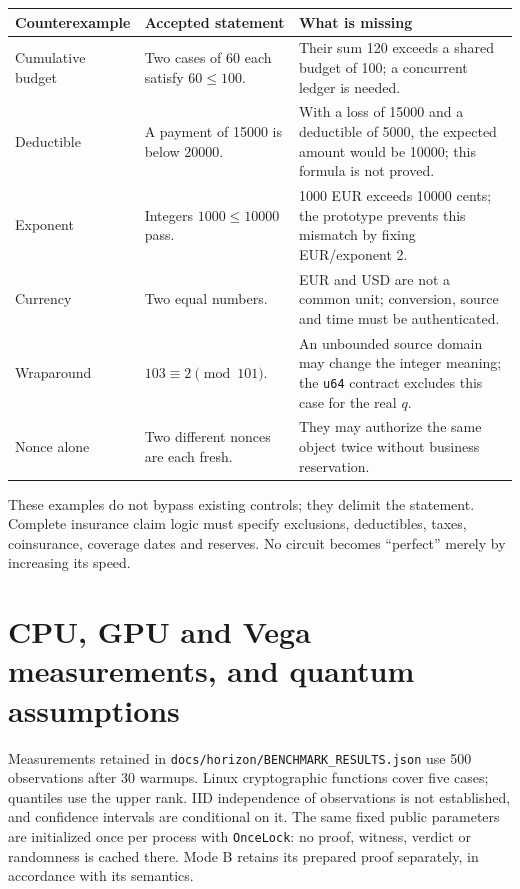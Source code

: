 \documentclass[11pt,a4paper]{article}
\newcommand{\code}[1]{\nolinkurl{#1}}
\begin{document}
\begin{center}\small
\begin{tabular}{p{.19\linewidth}p{.35\linewidth}p{.36\linewidth}}
\toprule
Counterexample & Accepted statement & What is missing \\
\midrule
Cumulative budget & Two cases of 60 each satisfy $60\le100$. & Their sum 120 exceeds a shared budget of 100; a concurrent ledger is needed. \\
Deductible & A payment of 15000 is below 20000. & With a loss of 15000 and a deductible of 5000, the expected amount would be 10000; this formula is not proved. \\
Exponent & Integers $1000\le10000$ pass. & 1000 EUR exceeds 10000 cents; the prototype prevents this mismatch by fixing EUR/exponent 2. \\
Currency & Two equal numbers. & EUR and USD are not a common unit; conversion, source and time must be authenticated. \\
Wraparound & $103\equiv2\pmod{101}$. & An unbounded source domain may change the integer meaning; the \code{u64} contract excludes this case for the real $q$. \\
Nonce alone & Two different nonces are each fresh. & They may authorize the same object twice without business reservation. \\
\bottomrule
\end{tabular}\end{center}
These examples do not bypass existing controls; they delimit the statement.
Complete insurance claim logic must specify exclusions, deductibles, taxes,
coinsurance, coverage dates and reserves. No circuit becomes ``perfect''
merely by increasing its speed.

\section{CPU, GPU and Vega measurements, and quantum assumptions}
Measurements retained in \code{docs/horizon/BENCHMARK_RESULTS.json}
use 500 observations after 30 warmups. Linux cryptographic functions cover
five cases; quantiles use the upper rank. IID independence of observations
is not established, and confidence intervals are conditional on it.
The same fixed public parameters are initialized once per process with
\code{OnceLock}: no proof, witness, verdict or randomness is cached there.
Mode B retains its prepared proof separately, in accordance with its semantics.
\end{document}
